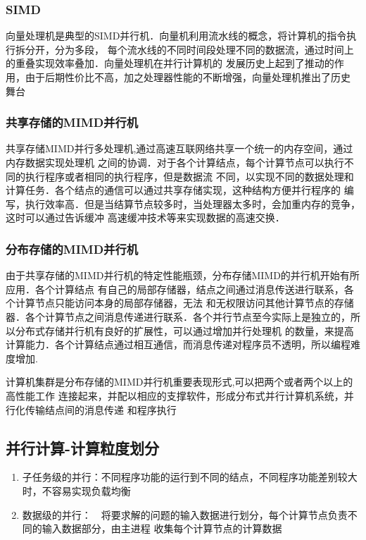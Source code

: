 \subsubsection{SIMD}
    向量处理机是典型的SIMD并行机．向量机利用流水线的概念，将计算机的指令执行拆分开，分为多段，
每个流水线的不同时间段处理不同的数据流，通过时间上的重叠实现效率叠加．向量处理机在并行计算机的
发展历史上起到了推动的作用，由于后期性价比不高，加之处理器性能的不断增强，向量处理机推出了历史
舞台
\subsubsection{共享存储的MIMD并行机}
    共享存储MIMD并行多处理机,通过高速互联网络共享一个统一的内存空间，通过内存数据实现处理机
之间的协调．对于各个计算结点，每个计算节点可以执行不同的执行程序或者相同的执行程序，但是数据流
不同，以实现不同的数据处理和计算任务．各个结点的通信可以通过共享存储实现，这种结构方便并行程序的
编写，执行效率高．但是当结算节点较多时，当处理器太多时，会加重内存的竞争，这时可以通过告诉缓冲
高速缓冲技术等来实现数据的高速交换．
\subsubsection{分布存储的MIMD并行机}
    由于共享存储的MIMD并行机的特定性能瓶颈，分布存储MIMD的并行机开始有所应用．各个计算结点
有自己的局部存储器，结点之间通过消息传送进行联系，各个计算节点只能访问本身的局部存储器，无法
和无权限访问其他计算节点的存储器．各个计算节点之间消息传递进行联系．各个并行节点至今实际上是独立的，所以分布式存储并行机有良好的扩展性，可以通过增加并行处理机
的数量，来提高计算能力．各个计算结点通过相互通信，而消息传递对程序员不透明，所以编程难度增加.

    计算机集群是分布存储的MIMD并行机重要表现形式,可以把两个或者两个以上的高性能工作
连接起来，并配以相应的支撑软件，形成分布式并行计算机系统，并行化传输结点间的消息传递
和程序执行


\subsection{并行计算-计算粒度划分}     
    \begin{enumerate}
    \item 子任务级的并行：不同程序功能的运行到不同的结点，不同程序功能差别较大时，不容易实现负载均衡
    \item 数据级的并行：　将要求解的问题的输入数据进行划分，每个计算节点负责不同的输入数据部分，由主进程
收集每个计算节点的计算数据
    \end{enumerate}

